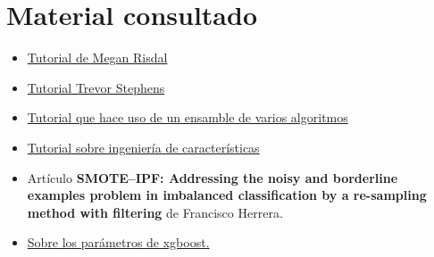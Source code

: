 \documentclass[10pt,a4paper]{article}
\begin{document}
\section{Material consultado}

\begin{itemize}
\item \href{https://www.kaggle.com/mrisdal/titanic/exploring-survival-on-the-titanic}{Tutorial de Megan Risdal}
\item \href{http://trevorstephens.com/kaggle-titanic-tutorial/getting-started-with-r/}{Tutorial Trevor Stephens}
\item \href{http://rpubs.com/Vincent/Titanic}{Tutorial que hace uso de un ensamble de varios algoritmos}
\item \href{https://triangleinequality.wordpress.com/2013/09/08/basic-feature-engineering-with-the-titanic-data/}{Tutorial sobre ingeniería de características}
\item Artículo \textbf{SMOTE–IPF: Addressing the noisy and borderline examples problem in imbalanced classification by a re-sampling method with filtering} de Francisco Herrera.
\item \href{https://github.com/dmlc/xgboost/blob/master/doc/parameter.md}{Sobre los parámetros de xgboost.}

\end{itemize}
\end{document}
